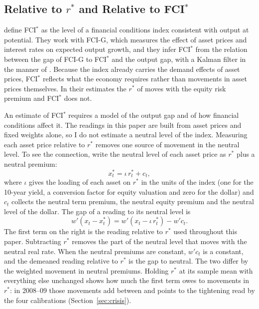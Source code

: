 \subsection{Relative to $r^*$ and Relative to FCI$^*$}\label{sec:fcistar}
\citet{caballero2026} define FCI$^*$ as the level of a financial conditions index consistent with output at potential. They work with FCI-G, which measures the effect of asset prices and interest rates on expected output growth, and they infer FCI$^*$ from the relation between the gap of FCI-G to FCI$^*$ and the output gap, with a Kalman filter in the manner of \citet{laubach2003}. Because the index already carries the demand effects of asset prices, FCI$^*$ reflects what the economy requires rather than movements in asset prices themselves. In their estimates the $r^*$ of \citet{holston2023} moves with the equity risk premium and FCI$^*$ does not.

An estimate of FCI$^*$ requires a model of the output gap and of how financial conditions affect it. The readings in this paper are built from asset prices and fixed weights alone, so I do not estimate a neutral level of the index. Measuring each asset price relative to $r^*$ removes one source of movement in the neutral level. To see the connection, write the neutral level of each asset price as $r^*$ plus a neutral premium:
\begin{equation}\label{eq:neutral}
x^*_t=\iota\, r^*_t+c_t ,
\end{equation}
where $\iota$ gives the loading of each asset on $r^*$ in the units of the index (one for the 10-year yield, a conversion factor for equity valuation and zero for the dollar) and $c_t$ collects the neutral term premium, the neutral equity premium and the neutral level of the dollar. The gap of a reading to its neutral level is
\begin{equation}\label{eq:gapdecomp}
w'(x_t-x^*_t)=w'(x_t-\iota\, r^*_t)-w'c_t .
\end{equation}
The first term on the right is the reading relative to $r^*$ used throughout this paper. Subtracting $r^*$ removes the part of the neutral level that moves with the neutral real rate. When the neutral premiums are constant, $w'c_t$ is a constant, and the demeaned reading relative to $r^*$ is the gap to neutral. The two differ by the weighted movement in neutral premiums. Holding $r^*$ at its sample mean with everything else unchanged shows how much the first term owes to movements in $r^*$: in 2008--09 those movements add between  and  points to the tightening read by the four calibrations (Section~\ref{sec:crisis}).

